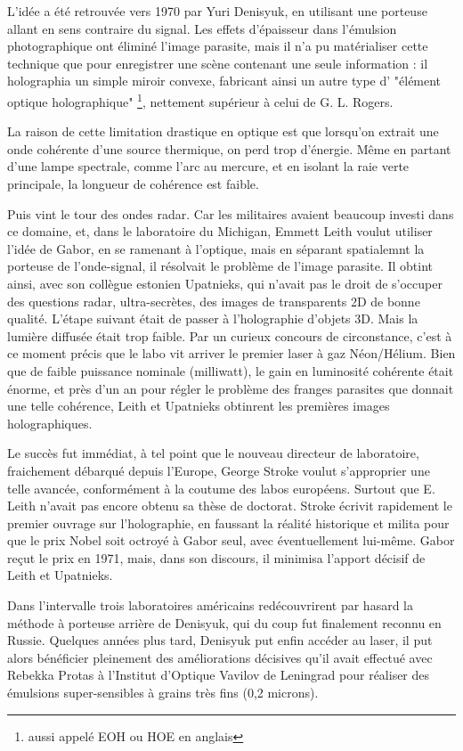 \documentclass[a4paper,12pt]{article}
\begin{document}
L'idée a été retrouvée vers 1970 par Yuri Denisyuk, en utilisant une porteuse allant en sens contraire du signal. Les effets d'épaisseur dans l'émulsion photographique ont éliminé l'image parasite, mais il n'a pu matérialiser cette technique que pour enregistrer une scène contenant une seule information : il holographia un simple miroir convexe, fabricant ainsi un autre type d' "élément optique holographique" \footnote{aussi appelé EOH ou HOE en anglais}, nettement supérieur à celui de G. L. Rogers.


La raison de cette limitation drastique en optique est que lorsqu'on extrait une onde cohérente d'une source thermique, on perd trop d'énergie. Même en partant d'une lampe spectrale, comme l'arc au mercure, et en isolant la raie verte principale, la longueur de cohérence est faible. 


Puis vint le tour des ondes radar. Car les militaires avaient beaucoup investi dans ce domaine, et, dans le laboratoire du Michigan, Emmett Leith voulut utiliser l'idée de Gabor, en se ramenant à l'optique, mais en séparant spatialemnt la porteuse de l'onde-signal, il résolvait le problème de l'image parasite. Il obtint ainsi, avec son collègue estonien Upatnieks, qui n'avait pas le droit de s'occuper des questions radar, ultra-secrètes, des images de transparents 2D de bonne qualité. L'étape suivant était de passer à l'holographie d'objets 3D. Mais la lumière diffusée était trop faible. Par un curieux concours de circonstance, c'est à ce moment précis que le labo vit arriver le premier laser à gaz Néon/Hélium. Bien que de faible puissance nominale (milliwatt), le gain en luminosité cohérente était énorme, et près d'un an pour régler le problème des franges parasites que donnait une telle cohérence, Leith et Upatnieks obtinrent les premières images holographiques.


Le succès fut immédiat, à tel point que le nouveau directeur de laboratoire, fraichement débarqué depuis l'Europe, George Stroke voulut s'approprier une telle avancée, conformément à la coutume des labos européens. Surtout que E. Leith n'avait pas encore obtenu sa thèse de doctorat. Stroke écrivit rapidement le premier ouvrage sur l'holographie, en faussant la réalité historique et milita pour que le prix Nobel soit octroyé à Gabor seul, avec éventuellement lui-même. Gabor reçut le prix en 1971, mais, dans son discours, il minimisa l'apport décisif de Leith et Upatnieks.


Dans l'intervalle trois laboratoires américains redécouvrirent par hasard la méthode à porteuse arrière de Denisyuk, qui du coup fut finalement reconnu en Russie. Quelques années plus tard, Denisyuk put enfin accéder au laser, il put alors bénéficier pleinement des améliorations décisives qu'il avait effectué avec Rebekka Protas à l'Institut d'Optique Vavilov de Leningrad pour réaliser des émulsions super-sensibles à grains très fins (0,2 microns). 
\end{document}
